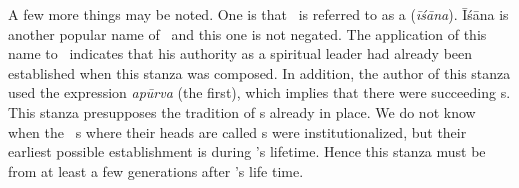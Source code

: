 

A few more things may be noted. One is that \Sankara\ is referred to as a  (\emph{īśāna}). Īśāna is another popular name of \Siva\ and this one is not negated. The application of this name to \Sankara\ indicates that his authority as a spiritual leader had already been established when this stanza was composed. In addition, the author of this stanza used the expression \emph{apūrva} (the first), which implies that there were succeeding \Sankara s. This stanza presupposes the tradition of \Sankaracarya s already in place. We do not know when the \Sankara\ \matha s where their heads are called \Sankaracarya s were institutionalized, but their earliest possible establishment is during \Sankara's lifetime. Hence this stanza must be from at least a few generations after \Sankara's life time. %

